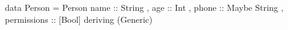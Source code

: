 \begin{code}
data Person = Person
  { name        :: String
  , age         :: Int
  , phone       :: Maybe String
  , permissions :: [Bool]
  }
  deriving (Generic)
\end{code}
